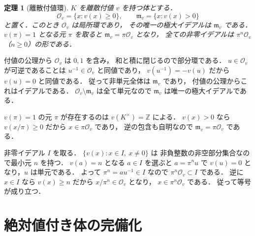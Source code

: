 \documentclass[a5paper,10pt,onecolumn]{jsarticle}
\makeatletter
\theoremstyle{mathnotetheorem}
\newtheorem{theorem}{定理}[section]
\renewcommand{\proofname}{証明}
\renewenvironment{proof}[1][\proofname]{%
  \par\pushQED{\qed}\normalfont\topsep4\p@\@plus2\p@\relax
  \trivlist\item[\hskip\labelsep\bfseries #1]\ignorespaces
}{\popQED\endtrivlist\@endpefalse}
\makeatother
\begin{document}
\begin{theorem}[離散付値環]\label{thm:dvr}
$K$ を離散付値 $v$ を持つ体とする．
\[
 \mathcal O_v=\{x:v(x)\ge0\},\qquad
 \mathfrak m_v=\{x:v(x)>0\}
\]
と置く．このとき $\mathcal O_v$ は局所環であり，
その唯一の極大イデアルは $\mathfrak m_v$ である．
$v(\pi)=1$ となる元 $\pi$ を取ると
$\mathfrak m_v=\pi\mathcal O_v$ となり，
全ての非零イデアルは $\pi^n\mathcal O_v$
（$n\ge0$）の形である．
\end{theorem}
\begin{proof}
付値の公理から $\mathcal O_v$ は $0,1$ を含み，
和と積に閉じるので部分環である．
$u\in\mathcal O_v$ が可逆であることは
$u^{-1}\in\mathcal O_v$ と同値であり，
$v(u^{-1})=-v(u)$ だから
$v(u)=0$ と同値である．
従って非単元全体は $\mathfrak m_v$ であり，
付値の公理からこれはイデアルである．
$\mathcal O_v\setminus\mathfrak m_v$ は全て単元なので
$\mathfrak m_v$ は唯一の極大イデアルである．

$v(\pi)=1$ の元 $\pi$ が存在するのは
$v(K^\times)=\mathbb Z$ による．
$v(x)>0$ なら
$v(x/\pi)\ge0$ だから $x\in\pi\mathcal O_v$ であり，
逆の包含も自明なので
$\mathfrak m_v=\pi\mathcal O_v$ である．

非零イデアル $I$ を取る．
$\{v(x):x\in I,\ x\ne0\}$ は
非負整数の非空部分集合なので最小元 $n$ を持つ．
$v(a)=n$ となる $a\in I$ を選ぶと
$a=\pi^nu$ で $v(u)=0$ となり，$u$ は単元である．
よって $\pi^n=au^{-1}\in I$ なので
$\pi^n\mathcal O_v\subset I$ である．
逆に $x\in I$ なら $v(x)\ge n$ だから
$x/\pi^n\in\mathcal O_v$ となり，
$x\in\pi^n\mathcal O_v$ である．
従って等号が成り立つ．
\end{proof}

\section{絶対値付き体の完備化}
\end{document}
